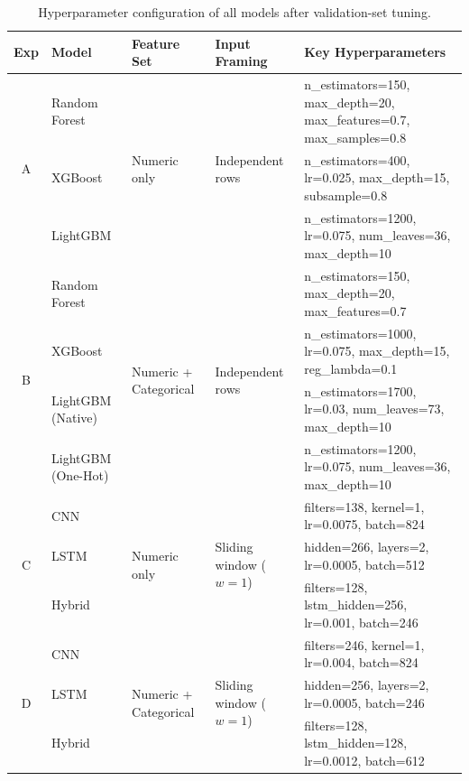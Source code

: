 \begin{landscape}
\begin{table}[htbp]
\vspace*{\fill}
\centering
\caption[Hyperparameter configuration]{Hyperparameter configuration of all models after validation-set tuning.}
\label{tab:hyperparams}
\footnotesize
\begin{tabular}{cll l p{9.4cm}}
\hline
\textbf{Exp} & \textbf{Model} & \textbf{Feature Set} & \textbf{Input Framing} & \textbf{Key Hyperparameters} \\ 
\hline
\multirow{3}{*}{A} & Random Forest & \multirow{3}{*}{Numeric only} & \multirow{3}{*}{Independent rows} & n\_estimators=150, max\_depth=20, max\_features=0.7, max\_samples=0.8 \\ 
                   & XGBoost       & & & n\_estimators=400, lr=0.025, max\_depth=15, subsample=0.8 \\ 
                   & LightGBM      & & & n\_estimators=1200, lr=0.075, num\_leaves=36, max\_depth=10 \\ 
\hline
\multirow{4}{*}{B} & Random Forest & \multirow{4}{*}{Numeric + Categorical} & \multirow{4}{*}{Independent rows} & n\_estimators=150, max\_depth=20, max\_features=0.7 \\ 
                   & XGBoost       & & & n\_estimators=1000, lr=0.075, max\_depth=15, reg\_lambda=0.1 \\ 
                   & LightGBM (Native) & & & n\_estimators=1700, lr=0.03, num\_leaves=73, max\_depth=10 \\ 
                   & LightGBM (One-Hot)& & & n\_estimators=1200, lr=0.075, num\_leaves=36, max\_depth=10 \\ 
\hline
\multirow{3}{*}{C} & CNN    & \multirow{3}{*}{Numeric only} & \multirow{3}{*}{Sliding window ($w=1$)} & filters=138, kernel=1, lr=0.0075, batch=824 \\ 
                   & LSTM   & & & hidden=266, layers=2, lr=0.0005, batch=512 \\ 
                   & Hybrid & & & filters=128, lstm\_hidden=256, lr=0.001, batch=246 \\ 
\hline
\multirow{3}{*}{D} & CNN    & \multirow{3}{*}{Numeric + Categorical} & \multirow{3}{*}{Sliding window ($w=1$)} & filters=246, kernel=1, lr=0.004, batch=824 \\ 
                   & LSTM   & & & hidden=256, layers=2, lr=0.0005, batch=246 \\ 
                   & Hybrid & & & filters=128, lstm\_hidden=128, lr=0.0012, batch=612 \\ 

\end{tabular}
\end{table}
\end{landscape}
